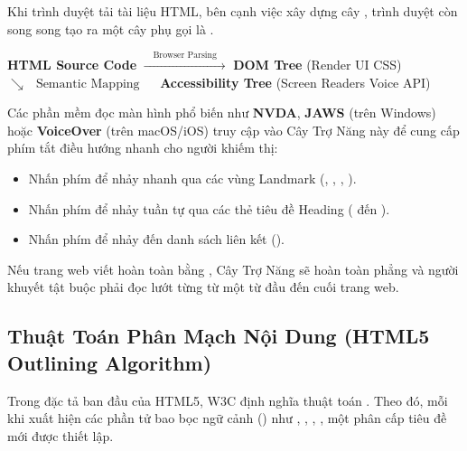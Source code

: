 Khi trình duyệt tải tài liệu HTML, bên cạnh việc xây dựng cây , trình duyệt còn song song tạo ra một cây phụ gọi là .

\begin{center}
\begin{tcolorbox}[
    enhanced, colback=codeBg!30!white, colframe=primaryBlue!25, arc=6pt, boxrule=0.8pt,
    top=10pt, bottom=10pt, left=12pt, right=12pt
]
\centering
\sffamily\small
\textbf{HTML Source Code} $\xrightarrow{\quad\text{Browser Parsing}\quad}$ \textbf{DOM Tree} (Render UI CSS) \\[4pt]
$\searrow\quad\text{Semantic Mapping}\quad$ \textbf{Accessibility Tree} (Screen Readers Voice API)
\end{tcolorbox}
\end{center}

Các phần mềm đọc màn hình phổ biến như \textbf{NVDA}, \textbf{JAWS} (trên Windows) hoặc \textbf{VoiceOver} (trên macOS/iOS) truy cập vào Cây Trợ Năng này để cung cấp phím tắt điều hướng nhanh cho người khiếm thị:
\begin{itemize}[leftmargin=1.8em, itemsep=3pt, parsep=0pt]
    \item Nhấn phím  để nhảy nhanh qua các vùng Landmark (, , , ).
    \item Nhấn phím  để nhảy tuần tự qua các thẻ tiêu đề Heading ( đến ).
    \item Nhấn phím  để nhảy đến danh sách liên kết ().
\end{itemize}
Nếu trang web viết hoàn toàn bằng , Cây Trợ Năng sẽ hoàn toàn phẳng và người khuyết tật buộc phải đọc lướt từng từ một từ đầu đến cuối trang web.

\subsection{Thuật Toán Phân Mạch Nội Dung (HTML5 Outlining Algorithm)}

Trong đặc tả ban đầu của HTML5, W3C định nghĩa thuật toán . Theo đó, mỗi khi xuất hiện các phần tử bao bọc ngữ cảnh () như , , , , một phân cấp tiêu đề mới được thiết lập.

